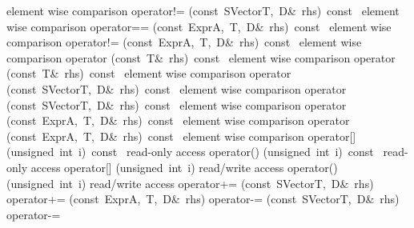 \documentclass{article}
\begin{document}
\begin{cxxentry}
\begin{cxxclass}
\begin{cxxpublic}
        { element wise comparison}
        {}
\label{cxx.1.1.30}
        {operator!=}
        {(const\ SVector\<T,\ D\>\&\ rhs)\ const\ }
        { element wise comparison}
        {}
\label{cxx.1.1.31}
        {operator==}
        {(const\ Expr\<A,\ T,\ D\>\&\ rhs)\ const\ }
        { element wise comparison}
        {}
\label{cxx.1.1.32}
        {operator!=}
        {(const\ Expr\<A,\ T,\ D\>\&\ rhs)\ const\ }
        { element wise comparison}
        {}
\label{cxx.1.1.33}
        {operator\>}
        {(const\ T\&\ rhs)\ const\ }
        { element wise comparison}
        {}
\label{cxx.1.1.34}
        {operator\<}
        {(const\ T\&\ rhs)\ const\ }
        { element wise comparison}
        {}
\label{cxx.1.1.35}
        {operator\>}
        {(const\ SVector\<T,\ D\>\&\ rhs)\ const\ }
        { element wise comparison}
        {}
\label{cxx.1.1.36}
        {operator\<}
        {(const\ SVector\<T,\ D\>\&\ rhs)\ const\ }
        { element wise comparison}
        {}
\label{cxx.1.1.37}
        {operator\>}
        {(const\ Expr\<A,\ T,\ D\>\&\ rhs)\ const\ }
        { element wise comparison}
        {}
\label{cxx.1.1.38}
        {operator\<}
        {(const\ Expr\<A,\ T,\ D\>\&\ rhs)\ const\ }
        { element wise comparison}
        {}
\label{cxx.1.1.39}
        {operator[]}
        {(unsigned\ int\ i)\ const\ }
        { read-only access}
        {}
\label{cxx.1.1.40}
        {operator()}
        {(unsigned\ int\ i)\ const\ }
        { read-only access}
        {}
\label{cxx.1.1.41}
        {operator[]}
        {(unsigned\ int\ i)}
        { read/write access}
        {}
\label{cxx.1.1.42}
        {operator()}
        {(unsigned\ int\ i)}
        { read/write access}
        {}
\label{cxx.1.1.43}
        {operator+=}
        {(const\ SVector\<T,\ D\>\&\ rhs)}
        {}
        {}
\label{cxx.1.1.44}
        {operator+=}
        {(const\ Expr\<A,\ T,\ D\>\&\ rhs)}
        {}
        {}
\label{cxx.1.1.45}
        {operator-=}
        {(const\ SVector\<T,\ D\>\&\ rhs)}
        {}
        {}
\label{cxx.1.1.46}
        {operator-=}

\end{cxxpublic}
\end{cxxclass}
\end{cxxentry}
\end{document}
